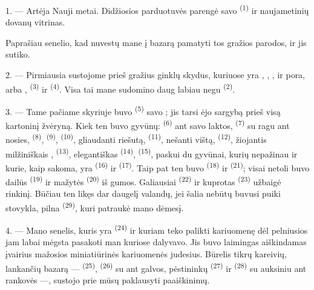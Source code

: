 1. --- Artėja Nauji metai. Didžiosios parduotuvės parengė savo 
\textsuperscript{(1)} ir naujametinių dovanų vitrinas.

Paprašiau senelio, kad nuvestų mane į bazarą pamatyti tos gražios parodos, ir jis
sutiko.

2. --- Pirmiausia sustojome prieš gražius ginklų skydus, kuriuose yra
, , ,  ir
 pora, arba ,  \textsuperscript{(3)} ir
 \textsuperscript{(4)}. Visa tai mane sudomino daug labiau negu
 \textsuperscript{(2)}.

\VUsaut{3.0mm}
\VUsaut{2.6mm}

3. --- Tame pačiame skyriuje buvo  \textsuperscript{(5)} savo
; jis tarsi ėjo sargybą prieš visą kartoninį žvėryną. Kiek ten buvo
gyvūnų:  \textsuperscript{(6)} ant savo laktos, 
\textsuperscript{(7)} su ragu ant nosies,  \textsuperscript{(8)},
 \textsuperscript{(9)},  \textsuperscript{(10)},
gliaudanti riešutą,  \textsuperscript{(11)}, nešanti vištą,
 \textsuperscript{(12)}, žiojantis milžiniškais
,  \textsuperscript{(13)}, elegantiškas
 \textsuperscript{(14)},  \textsuperscript{(15)}, paskui du
gyvūnai, kurių nepažinau ir kurie, kaip sakoma, yra 
\textsuperscript{(16)} ir  \textsuperscript{(17)}. Taip pat ten buvo
 \textsuperscript{(18)} ir  \textsuperscript{(21)};
visai netoli buvo dailūs  \textsuperscript{(19)} ir mažytės
 \textsuperscript{(20)} iš gumos. Galiausiai 
\textsuperscript{(22)} ir kuprotas  \textsuperscript{(23)} užbaigė
rinkinį. Būčiau ten likęs dar daugelį valandų, jei šalia nebūtų buvusi puiki
stovykla, pilna  \textsuperscript{(29)}, kuri patraukė
mano dėmesį.

\VUsaut{4.0mm}
\VUsaut{2.8mm}

4. --- Mano senelis, kuris yra  \textsuperscript{(24)} ir kuriam
teko palikti kariuomenę dėl  pelniusios jam 
labai mėgsta pasakoti man  kuriose dalyvavo. Jis buvo laimingas
aiškindamas įvairius mažosios miniatiūrinės kariuomenės judesius. Būrelis tikrų
kareivių, lankančių bazarą ---  \textsuperscript{(25)},
 \textsuperscript{(26)} su  ant galvos, pėstininkų
 \textsuperscript{(27)} ir 
\textsuperscript{(28)} su auksiniu  ant rankovės ---, sustojo prie mūsų
paklausyti paaiškinimų.

